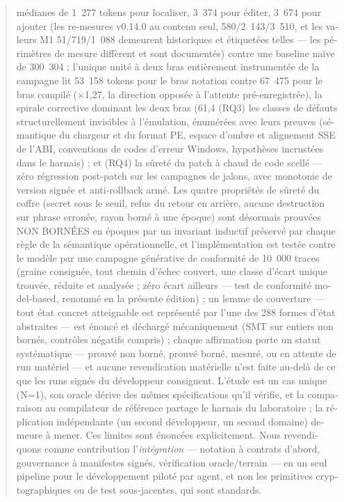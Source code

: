 \documentclass[11pt,a4paper]{article}
\begin{document}
\begin{otherlanguage}{french}
\begin{abstract}
médianes de 1~277 tokens pour localiser, 3~374 pour éditer, 3~674 pour
ajouter (les re-mesures v0.14.0 au contenu seul, 580/2~143/3~510, et les
valeurs M1 51/719/1~088 demeurent historiques et étiquetées telles — les
périmètres de mesure diffèrent et sont documentés) contre une baseline
naïve de 300~304 ; l'unique unité à deux
bras entièrement instrumentée de la campagne lit 53~158 tokens pour le
bras notation contre 67~475 pour le bras compilé (×1,27, la direction
opposée à l'attente pré-enregistrée), la spirale corrective dominant les
deux bras (61,4 %
(RQ3) les classes de défauts structurellement invisibles à l'émulation,
énumérées avec leurs preuves (sémantique du chargeur et du format PE,
espace d'ombre et alignement SSE de l'ABI, conventions de codes d'erreur
Windows, hypothèses incrustées dans le harnais) ; et (RQ4) la sûreté du
patch à chaud de code scellé — zéro régression post-patch sur les
campagnes de jalons, avec monotonie de version signée et anti-rollback
armé. Les quatre propriétés de sûreté du coffre (secret sous le seuil, refus du retour en arrière, aucune destruction sur phrase erronée, rayon borné à une époque) sont désormais prouvées NON BORNÉES en époques par un invariant inductif préservé par chaque règle de la sémantique opérationnelle, et l'implémentation est testée contre le modèle par une campagne générative de conformité de 10~000 traces (graine consignée, tout chemin d'échec couvert, une classe d'écart unique trouvée, réduite et analysée ; zéro écart ailleurs — test de conformité model-based, renommé en la présente édition) ; un lemme de couverture — tout état concret atteignable est représenté par l'une des 288 formes d'état abstraites — est énoncé et déchargé mécaniquement (SMT sur entiers non bornés, contrôles négatifs compris) ; chaque affirmation porte un statut systématique — prouvé non borné, prouvé borné, mesuré, ou en attente de run matériel — et aucune revendication matérielle n'est faite au-delà de ce que les runs signés du développeur consignent. L'étude est un cas unique (N=1), son oracle dérive des mêmes
spécifications qu'il vérifie, et la comparaison au compilateur de référence
partage le harnais du laboratoire ; la réplication indépendante (un second
développeur, un second domaine) demeure à mener. Ces limites sont
énoncées explicitement. Nous
revendiquons comme contribution l'\emph{intégration} — notation à
contrats d'abord, gouvernance à manifestes signés, vérification
oracle/terrain — en un seul pipeline pour le développement piloté par
agent, et non les primitives cryptographiques ou de test sous-jacentes,
qui sont standards.
\end{abstract}
\end{otherlanguage}
\end{document}
